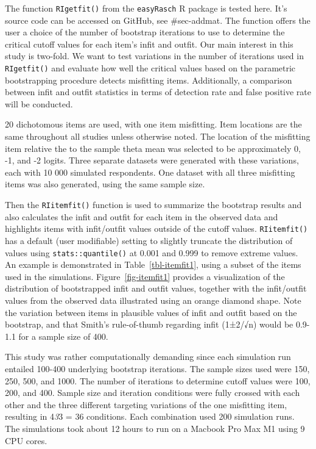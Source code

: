 \documentclass[
  letterpaper,
  DIV=11,
  numbers=noendperiod]{scrartcl}
\begin{document}
The function \texttt{RIgetfit()} from the \texttt{easyRasch} R package
is tested here. It's source code can be accessed on GitHub, see
\#sec-addmat. The function offers the user a choice of the number of
bootstrap iterations to use to determine the critical cutoff values for
each item's infit and outfit. Our main interest in this study is
two-fold. We want to test variations in the number of iterations used in
\texttt{RIgetfit()} and evaluate how well the critical values based on
the parametric bootstrapping procedure detects misfitting items.
Additionally, a comparison between infit and outfit statistics in terms
of detection rate and false positive rate will be conducted.

20 dichotomous items are used, with one item misfitting. Item locations
are the same throughout all studies unless otherwise noted. The location
of the misfitting item relative the to the sample theta mean was
selected to be approximately 0, -1, and -2 logits. Three separate
datasets were generated with these variations, each with 10 000
simulated respondents. One dataset with all three misfitting items was
also generated, using the same sample size.

Then the \texttt{RIitemfit()} function is used to summarize the
bootstrap results and also calculates the infit and outfit for each item
in the observed data and highlights items with infit/outfit values
outside of the cutoff values. \texttt{RIitemfit()} has a default (user
modifiable) setting to slightly truncate the distribution of values
using \texttt{stats::quantile()} at 0.001 and 0.999 to remove extreme
values. An example is demonstrated in Table~\ref{tbl-itemfit1}, using a
subset of the items used in the simulations. Figure~\ref{fig-itemfit1}
provides a visualization of the distribution of bootstrapped infit and
outfit values, together with the infit/outfit values from the observed
data illustrated using an orange diamond shape. Note the variation
between items in plausible values of infit and outfit based on the
bootstrap, and that Smith's rule-of-thumb regarding infit (1±2/√n) would
be 0.9-1.1 for a sample size of 400.

This study was rather computationally demanding since each simulation
run entailed 100-400 underlying bootstrap iterations. The sample sizes
used were 150, 250, 500, and 1000. The number of iterations to determine
cutoff values were 100, 200, and 400. Sample size and iteration
conditions were fully crossed with each other and the three different
targeting variations of the one misfitting item, resulting in 4\emph{3}3
= 36 conditions. Each combination used 200 simulation runs. The
simulations took about 12 hours to run on a Macbook Pro Max M1 using 9
CPU cores.
\end{document}
